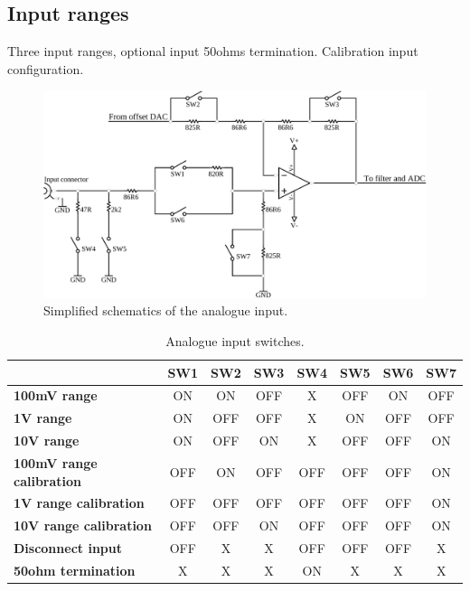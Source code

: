 \documentclass[11pt,a4paper]{article}
\begin{document}
\subsection{Input ranges}
Three input ranges, optional input 50ohms termination.
Calibration input configuration.

\begin{figure}[h!]
  \includegraphics[width=\textwidth]{figures/analogue_input.pdf}
  \caption{Simplified schematics of the analogue input.}
  \label{fig:analogue_input}
\end{figure}

\begin{table}[ht]
  \centering
  \begin{tabularx}{\textwidth}{| X | c | c | c | c | c | c | c |}
    \hline
    & \textbf{SW1} & \textbf{SW2}  & \textbf{SW3} & \textbf{SW4} & \textbf{SW5} & \textbf{SW6} & \textbf{SW7} \\
    \hline
    \textbf{100mV range} & ON & ON & OFF & X & OFF & ON & OFF \\
    \hline
    \textbf{1V range} & ON & OFF & OFF & X & ON & OFF & OFF \\
    \hline
    \textbf{10V range} & ON & OFF & ON & X & OFF & OFF & ON \\
    \hline
    \textbf{100mV range calibration} & OFF & ON & OFF & OFF & OFF & OFF & ON \\
    \hline
    \textbf{1V range calibration} & OFF & OFF & OFF & OFF & OFF & OFF & ON \\
    \hline
    \textbf{10V range calibration} & OFF & OFF & ON & OFF & OFF & OFF & ON \\
    \hline
    \textbf{Disconnect input} & OFF & X & X & OFF & OFF & OFF & X \\
    \hline
    \textbf{50ohm termination} & X & X & X & ON & X & X & X \\
    \hline
  \end{tabularx}
  \caption{Analogue input switches.}
  \label{tab:input_sw}
\end{table}
\end{document}
